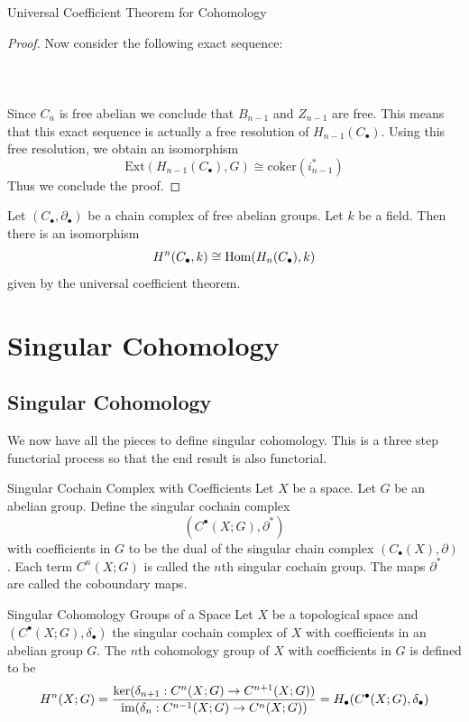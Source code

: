 \documentclass[a4paper]{article}
\begin{document}
\begin{thm}{Universal Coefficient Theorem for Cohomology}{}
\begin{proof}
Now consider the following exact sequence: \\~\\
\\~\\
Since $C_n$ is free abelian we conclude that $B_{n-1}$ and $Z_{n-1}$ are free. This means that this exact sequence is actually a free resolution of $H_{n-1}(C_\bullet)$. Using this free resolution, we obtain an isomorphism $$\text{Ext}(H_{n-1}(C_\bullet),G)\cong\text{coker}(i_{n-1}^\ast)$$ Thus we conclude the proof. 
\end{proof}
\end{thm}

\begin{crl}{}{} Let $(C_\bullet,\partial_\bullet)$ be a chain complex of free abelian groups. Let $k$ be a field. Then there is an isomorphism $$H^n(C_\bullet,k)\cong\operatorname{Hom}(H_n(C_\bullet),k)$$ given by the universal coefficient theorem. 
\end{crl}

\pagebreak
\section{Singular Cohomology}
\subsection{Singular Cohomology}
We now have all the pieces to define singular cohomology. This is a three step functorial process so that the end result is also functorial. 

\begin{defn}{Singular Cochain Complex with Coefficients}{} Let $X$ be a space. Let $G$ be an abelian group. Define the singular cochain complex $$(C^\bullet(X;G),\partial^\ast)$$ with coefficients in $G$ to be the dual of the singular chain complex $(C_\bullet(X),\partial)$. Each term $C^n(X;G)$ is called the $n$th singular cochain group. The maps $\partial^\ast$ are called the coboundary maps. 
\end{defn}

\begin{defn}{Singular Cohomology Groups of a Space}{} Let $X$ be a topological space and $(C^\bullet(X;G),\delta_\bullet)$ the singular cochain complex of $X$ with coefficients in an abelian group $G$. The $n$th cohomology group of $X$ with coefficients in $G$ is defined to be $$H^n(X;G)=\frac{\ker(\delta_{n+1}:C^n(X;G)\to C^{n+1}(X;G))}{\operatorname{im}(\delta_n:C^{n-1}(X;G)\to C^n(X;G))}=H_\bullet(C^\bullet(X;G),\delta_\bullet)$$
\end{defn}
\end{document}
